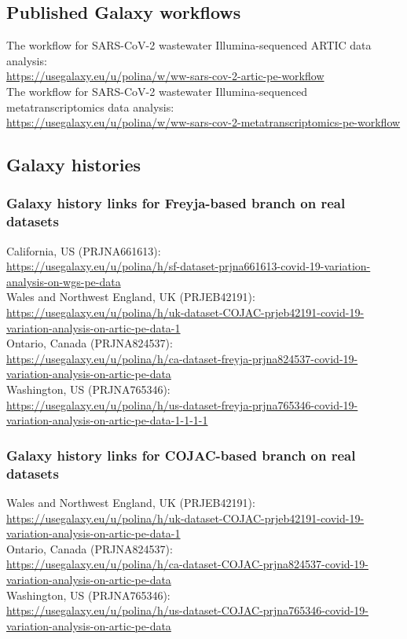     \subsection{Published Galaxy workflows} \label{sec:appendix:galaxy-wfs}
    The workflow for SARS-CoV-2 wastewater Illumina-sequenced ARTIC data analysis: \\
    \url{https://usegalaxy.eu/u/polina/w/ww-sars-cov-2-artic-pe-workflow} \\
    
    The workflow for SARS-CoV-2 wastewater Illumina-sequenced metatranscriptomics data analysis: \\
    \url{https://usegalaxy.eu/u/polina/w/ww-sars-cov-2-metatranscriptomics-pe-workflow} \\

    \subsection{Galaxy histories} \label{sec:appendix:galaxy-hist}
    \subsubsection{Galaxy history links for Freyja-based branch on real datasets}
    California, US (PRJNA661613): \\
   \url{https://usegalaxy.eu/u/polina/h/sf-dataset-prjna661613-covid-19-variation-analysis-on-wgs-pe-data}\\
    Wales and Northwest England, UK (PRJEB42191): \\
    \url{https://usegalaxy.eu/u/polina/h/uk-dataset-COJAC-prjeb42191-covid-19-variation-analysis-on-artic-pe-data-1}\\
    Ontario, Canada (PRJNA824537): \\
    \url{https://usegalaxy.eu/u/polina/h/ca-dataset-freyja-prjna824537-covid-19-variation-analysis-on-artic-pe-data}\\
    Washington, US (PRJNA765346): \\
    \url{https://usegalaxy.eu/u/polina/h/us-dataset-freyja-prjna765346-covid-19-variation-analysis-on-artic-pe-data-1-1-1-1}

    \subsubsection{Galaxy history links for COJAC-based branch on real datasets}
    Wales and Northwest England, UK (PRJEB42191): \\
    \url{https://usegalaxy.eu/u/polina/h/uk-dataset-COJAC-prjeb42191-covid-19-variation-analysis-on-artic-pe-data-1}\\
    Ontario, Canada (PRJNA824537): \\
    \url{https://usegalaxy.eu/u/polina/h/ca-dataset-COJAC-prjna824537-covid-19-variation-analysis-on-artic-pe-data}\\
    Washington, US (PRJNA765346): \\
    \url{https://usegalaxy.eu/u/polina/h/us-dataset-COJAC-prjna765346-covid-19-variation-analysis-on-artic-pe-data}
    
